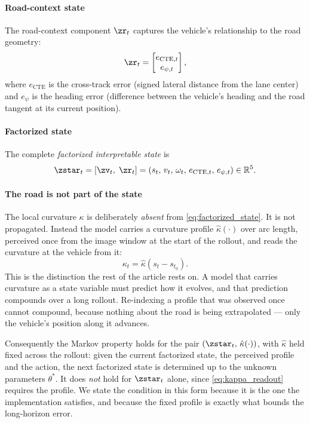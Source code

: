 \paragraph{Road-context state}
The road-context component $\zr_t$ captures the vehicle's relationship to the
road geometry:
\begin{equation}
    \zr_t =
    \begin{bmatrix}
        e_{\mathrm{CTE},t} \\ e_{\psi,t}
    \end{bmatrix},
    \label{eq:road_ctx}
\end{equation}
where $e_{\mathrm{CTE}}$ is the cross-track error (signed lateral distance from
the lane center) and $e_{\psi}$ is the heading error (difference between the
vehicle's heading and the road tangent at its current position).

\paragraph{Factorized state}
The complete \emph{factorized interpretable state} is
\begin{equation}
    \zstar_t = \left[ \zv_t,\; \zr_t \right]
             = \left( s_t,\, v_t,\, \omega_t,\, e_{\mathrm{CTE},t},\, e_{\psi,t} \right)
             \in \mathbb{R}^5 .
    \label{eq:factorized_state}
\end{equation}

\paragraph{The road is not part of the state}
The local curvature $\kappa$ is deliberately \emph{absent} from
\eqref{eq:factorized_state}. It is not propagated. Instead the model carries a
curvature profile $\hat\kappa(\cdot)$ over arc length, perceived once from the
image window at the start of the rollout, and reads the curvature at the
vehicle from it:
\begin{equation}
    \kappa_t = \hat\kappa\!\left(s_t - s_{t_0}\right).
    \label{eq:kappa_readout}
\end{equation}
This is the distinction the rest of the article rests on. A model that carries
curvature as a state variable must predict how it evolves, and that prediction
compounds over a long rollout. Re-indexing a profile that was observed once
cannot compound, because nothing about the road is being extrapolated --- only
the vehicle's position along it advances.

Consequently the Markov property holds for the pair
$\left(\zstar_t,\, \hat\kappa(\cdot)\right)$, with $\hat\kappa$ held fixed
across the rollout: given the current factorized state, the perceived profile
and the action, the next factorized state is determined up to the unknown
parameters $\theta^*$. It does \emph{not} hold for $\zstar_t$ alone, since
\eqref{eq:kappa_readout} requires the profile. We state the condition in this
form because it is the one the implementation satisfies, and because the fixed
profile is exactly what bounds the long-horizon error.

